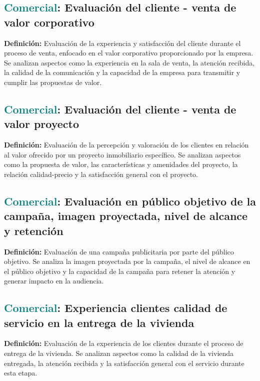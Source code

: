 \documentclass[12pt]{article}
\begin{document}
\subsection{\textcolor{teal}{Comercial}: Evaluación del cliente - venta de valor corporativo}
\textbf{Definición:} Evaluación de la experiencia y satisfacción del cliente durante el proceso de venta, enfocado en el valor corporativo proporcionado por la empresa. Se analizan aspectos como la experiencia en la sala de venta, la atención recibida, la calidad de la comunicación y la capacidad de la empresa para transmitir y cumplir las propuestas de valor.
\subsection{\textcolor{teal}{Comercial}: Evaluación del cliente - venta de valor proyecto}
\textbf{Definición:} Evaluación de la percepción y valoración de los clientes en relación al valor ofrecido por un proyecto inmobiliario específico. Se analizan aspectos como la propuesta de valor, las características y amenidades del proyecto, la relación calidad-precio y la satisfacción general con el proyecto.
\subsection{\textcolor{teal}{Comercial}: Evaluación en público objetivo de la campaña, imagen proyectada, nivel de alcance y retención}
\textbf{Definición:} Evaluación de una campaña publicitaria por parte del público objetivo. Se analiza la imagen proyectada por la campaña, el nivel de alcance en el público objetivo y la capacidad de la campaña para retener la atención y generar impacto en la audiencia.
\subsection{\textcolor{teal}{Comercial}: Experiencia clientes calidad de servicio en la entrega de la vivienda}
\textbf{Definición:} Evaluación de la experiencia de los clientes durante el proceso de entrega de la vivienda. Se analizan aspectos como la calidad de la vivienda entregada, la atención recibida y la satisfacción general con el servicio durante esta etapa.
\end{document}
